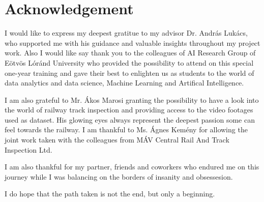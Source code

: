 \section*{Acknowledgement}
I would like to express my deepest gratitue to my advisor Dr. András Lukács,
who supported me with his guidance and valuable insights throughout my project work.
Also I would like say thank you to the colleagues of AI Research Group of Eötvös Lóránd University
who provided the possibility to attend on this special one-year training and gave their best
to enlighten us as students to the world of data analytics and data science, Machine Learning and
Artifical Intelligence.

I am also grateful to Mr. Ákos Marosi granting the possibility to have a
look into the world of railway track inspection and providing access to the video
footages used as dataset.
His glowing eyes always represent the deepest passion some can feel towards the railway.
I am thankful to Ms. Ágnes Kemény for allowing the joint work taken with the colleagues
from MÁV Central Rail And Track Inspection Ltd.

I am also thankful for my partner, friends and coworkers who endured me on this journey while
I was balancing on the borders of insanity and obsessesion.

I do hope that the path taken is not the end, but only a beginning.